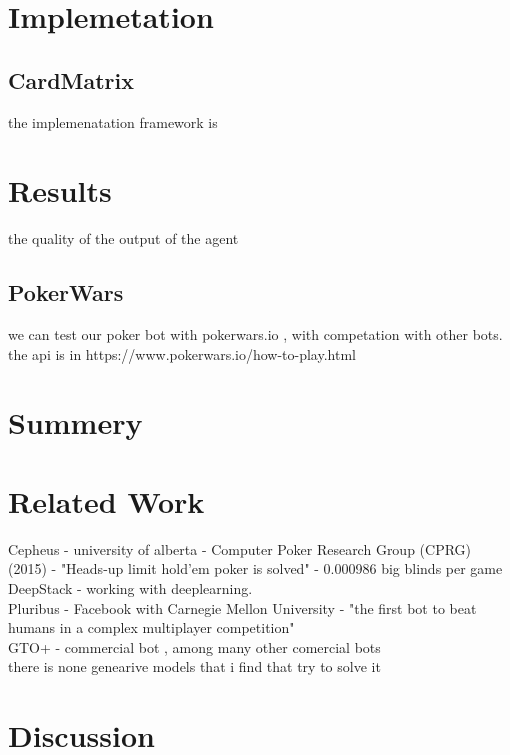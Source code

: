 \documentclass{article}
\begin{document}
\section{Implemetation}
\subsection{CardMatrix}
the implemenatation framework is
\section{Results}
the quality of the output of the agent
\subsection{PokerWars}
we can test our poker bot with pokerwars.io , with competation with other bots.
the api is in https://www.pokerwars.io/how-to-play.html
\section{Summery}
\section{Related Work}
Cepheus   - university of alberta -  Computer Poker Research Group (CPRG) (2015) - "Heads-up limit hold’em poker is solved" - 0.000986 big blinds per game \\
DeepStack - working with deeplearning.\\
Pluribus - Facebook with Carnegie Mellon University -  "the first bot to beat humans in a complex multiplayer competition"\\
GTO+ - commercial bot , among many other comercial bots \\
there is none genearive models that i find that try to solve it
\section{Discussion}
\end{document}
